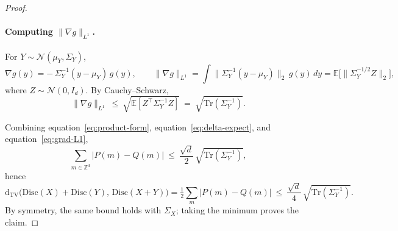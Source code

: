 \documentclass[10pt,a4paper]{amsart}
\def\eqref#1{equation~\ref{#1}}
\newcommand{\disc}{\mathrm{Disc}}
\newcommand{\dtv}{\mathrm{d_{TV}}}
\begin{document}
\begin{proof}
\paragraph{Computing $\|\nabla g\|_{L^1}$.}
For $Y\sim\mathcal{N}(\mu_Y,\Sigma_Y)$,
\[
\nabla g(y)=-\,\Sigma_Y^{-1}(y-\mu_Y)\,g(y),
\qquad
\|\nabla g\|_{L^1}=\int \|\Sigma_Y^{-1}(y-\mu_Y)\|_2\,g(y)\,dy
=\mathbb{E}\big[\|\Sigma_Y^{-1/2}Z\|_2\big],
\]
where $Z\sim\mathcal{N}(0,I_d)$. By Cauchy--Schwarz,
\begin{equation}\label{eq:grad-L1}
\|\nabla g\|_{L^1}\ \le\ \sqrt{\mathbb{E}\!\left[Z^\top \Sigma_Y^{-1} Z\right]}\ =\ \sqrt{\mathrm{Tr}(\Sigma_Y^{-1})}.
\end{equation}

Combining \eqref{eq:product-form}, \eqref{eq:delta-expect}, and \eqref{eq:grad-L1},
\[
\sum_{m\in\mathbb{Z}^d}\!|P(m)-Q(m)|\ \le\ \frac{\sqrt{d}}{2}\,\sqrt{\mathrm{Tr}(\Sigma_Y^{-1})},
\]
hence
\[
\dtv\!\big(\disc(X)+\disc(Y),\,\disc(X+Y)\big)
=\tfrac12\sum_{m}|P(m)-Q(m)|
\ \le\ \frac{\sqrt{d}}{4}\,\sqrt{\mathrm{Tr}(\Sigma_Y^{-1})}.
\]
By symmetry, the same bound holds with $\Sigma_X$; taking the minimum proves the claim.
\end{proof}
\end{document}

